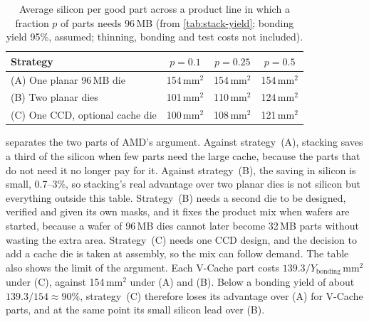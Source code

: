 \begin{table}[htbp]
  \centering
  \caption[Average silicon per good part across a product line]{Average silicon per good part across a product line in which a fraction $p$ of parts needs 96\,MB (from \cref{tab:stack-yield}; bonding yield 95\%, assumed; thinning, bonding and test costs not included).}
  \label{tab:product-line-silicon}
  \small
  \begin{tabular}{@{}lccc@{}}
    \toprule
    \textbf{Strategy} & $p = 0.1$ & $p = 0.25$ & $p = 0.5$ \\
    \midrule
    (A) One planar 96\,MB die & 154\,mm$^2$ & 154\,mm$^2$ & 154\,mm$^2$ \\
    (B) Two planar dies & 101\,mm$^2$ & 110\,mm$^2$ & 124\,mm$^2$ \\
    (C) One CCD, optional cache die & 100\,mm$^2$ & 108\,mm$^2$ & 121\,mm$^2$ \\
    \bottomrule
  \end{tabular}
\end{table}

 separates the two parts of AMD's argument. Against strategy~(A), stacking saves a third of the silicon when few parts need the large cache, because the parts that do not need it no longer pay for it. Against strategy~(B), the saving in silicon is small, 0.7--3\%, so stacking's real advantage over two planar dies is not silicon but everything outside this table. Strategy~(B) needs a second die to be designed, verified and given its own masks, and it fixes the product mix when wafers are started, because a wafer of 96\,MB dies cannot later become 32\,MB parts without wasting the extra area. Strategy~(C) needs one CCD design, and the decision to add a cache die is taken at assembly, so the mix can follow demand. The table also shows the limit of the argument. Each V-Cache part costs $139.3/Y_{\mathrm{bonding}}$\,mm$^2$ under (C), against 154\,mm$^2$ under (A) and (B). Below a bonding yield of about $139.3/154 \approx 90\%$, strategy~(C) therefore loses its advantage over (A) for V-Cache parts, and at the same point its small silicon lead over (B).

